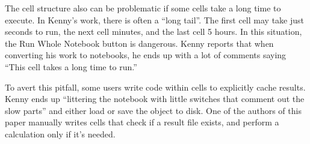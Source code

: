 The cell structure also can be problematic if some cells take a long time to
execute. In Kenny's work, there is often a ``long tail''.  The first cell may
take just seconds to run, the next cell minutes, and the last cell 5 hours.
In this situation, the Run Whole Notebook button is dangerous.
Kenny reports that when converting his work to notebooks, he
ends up with a lot of comments saying ``This cell takes a long time to run.''

To avert this pitfall, some users write code within cells to explicitly cache results.
Kenny ends up ``littering the notebook with little switches that comment out the
slow parts'' and either load or save the object to disk. One of the authors of this paper
manually writes cells that check if a result file exists, and perform a calculation only
if it's needed.








